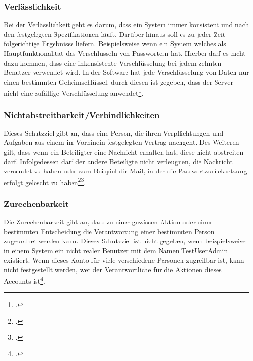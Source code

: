 \subsubsection{Verlässlichkeit}
Bei der Verlässlichkeit geht es darum, dass ein System immer konsistent und nach den festgelegten Spezifikationen läuft. Darüber hinaus soll es zu jeder Zeit folgerichtige Ergebnisse liefern. Beispielsweise wenn ein System welches als Hauptfunktionalität das Verschlüsseln von Passwörtern hat. Hierbei darf es nicht dazu kommen, dass eine inkonsistente Verschlüsselung bei jedem zehnten Benutzer verwendet wird.
In der Software hat jede Verschlüsselung von Daten nur einen bestimmten Geheimschlüssel, durch diesen ist gegeben, dass der Server nicht eine zufällige Verschlüsselung anwendet\footcite{Lehrunterlagen-HTL-cloud}.


\subsubsection{Nichtabstreitbarkeit/Verbindlichkeiten}
Dieses Schutzziel gibt an, dass eine Person, die ihren Verpflichtungen und Aufgaben aus einem im Vorhinein festgelegten Vertrag nachgeht. Des Weiteren gilt, dass wenn ein Beteiligter eine Nachricht erhalten hat, diese nicht abstreiten darf. Infolgedessen darf der andere Beteiligte nicht verleugnen, die Nachricht versendet zu haben oder zum Beispiel die Mail, in der die Passwortzurücksetzung erfolgt gelöscht zu haben\footcite{Lehrunterlagen-HTL-cloud}\footcite{non-repu}.

\subsubsection{Zurechenbarkeit}
Die Zurechenbarkeit gibt an, dass zu einer gewissen Aktion oder einer bestimmten Entscheidung die Verantwortung einer bestimmten Person zugeordnet werden kann. Dieses Schutzziel ist nicht gegeben, wenn beispielsweise in einem System ein nicht realer Benutzer mit dem Namen TestUserAdmin existiert. Wenn dieses Konto für viele verschiedene Personen zugreifbar ist, kann nicht festgestellt werden, wer der Verantwortliche für die Aktionen dieses Accounts ist\footcite{Lehrunterlagen-HTL-cloud}.

